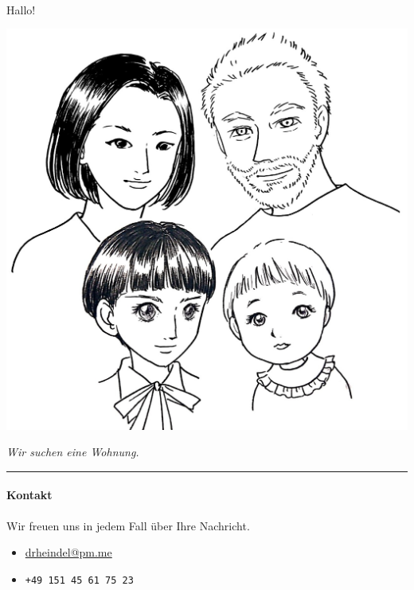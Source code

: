 \documentclass[landscape,a4paper,12pt]{article}
\begin{document}
\noindent%
~\\[0ex]
\begin{minipage}[c]{.47\linewidth}
  \Huge Hallo!
  \begin{center}
    \includegraphics[width=\linewidth]{picNarrow.jpeg}
  \end{center}
  \begin{center}
      \huge \emph{{Wir suchen eine Wohnung.}}
  \end{center}
  \hrule
  \vfill
  
  \normalsize
  
\paragraph{Kontakt}
Wir freuen uns in jedem Fall über Ihre Nachricht.
\begin{itemize}
\item \url{drheindel@pm.me}
\item \texttt{+49 151 45 61 75 23}
\end{itemize}
\end{minipage}%
\quad\quad\quad
\end{document}

